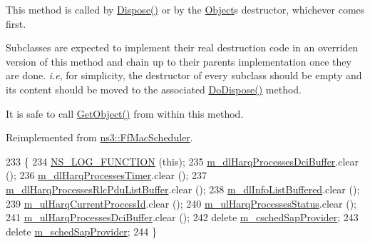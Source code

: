 This method is called by \hyperlink{classns3_1_1Object_aa90ae598863f6c251cdab3c3722afdaf}{Dispose()} or by the \hyperlink{classns3_1_1Object}{Object}\textquotesingle{}s destructor, whichever comes first.

Subclasses are expected to implement their real destruction code in an overriden version of this method and chain up to their parent\textquotesingle{}s implementation once they are done. {\itshape i.\+e}, for simplicity, the destructor of every subclass should be empty and its content should be moved to the associated \hyperlink{classns3_1_1TdMtFfMacScheduler_a8bc40bbb105e766f87f1272bc52bcc86}{Do\+Dispose()} method.

It is safe to call \hyperlink{classns3_1_1Object_a13e18c00017096c8381eb651d5bd0783}{Get\+Object()} from within this method. 

Reimplemented from \hyperlink{classns3_1_1FfMacScheduler_a771411e455992b81d8399681779debd9}{ns3\+::\+Ff\+Mac\+Scheduler}.


\begin{DoxyCode}
233 \{
234   \hyperlink{log-macros-disabled_8h_a90b90d5bad1f39cb1b64923ea94c0761}{NS\_LOG\_FUNCTION} (\textcolor{keyword}{this});
235   \hyperlink{classns3_1_1TdMtFfMacScheduler_ac1da1d9622aa19e81514421bd668bd63}{m\_dlHarqProcessesDciBuffer}.clear ();
236   \hyperlink{classns3_1_1TdMtFfMacScheduler_aa83d8f55bde8ea32e73820ad50ba2821}{m\_dlHarqProcessesTimer}.clear ();
237   \hyperlink{classns3_1_1TdMtFfMacScheduler_a5c8ba74976d19c98462ea970613b644b}{m\_dlHarqProcessesRlcPduListBuffer}.clear ();
238   \hyperlink{classns3_1_1TdMtFfMacScheduler_a4237ad4223d377a1c9963a904acbe4ad}{m\_dlInfoListBuffered}.clear ();
239   \hyperlink{classns3_1_1TdMtFfMacScheduler_a01393611d03f7107ec6c0a0db95858c2}{m\_ulHarqCurrentProcessId}.clear ();
240   \hyperlink{classns3_1_1TdMtFfMacScheduler_a0a4599be9db713d937b6d524a8546f19}{m\_ulHarqProcessesStatus}.clear ();
241   \hyperlink{classns3_1_1TdMtFfMacScheduler_a25c9425db7dae9dad47cd58ae3b70faf}{m\_ulHarqProcessesDciBuffer}.clear ();
242   \textcolor{keyword}{delete} \hyperlink{classns3_1_1TdMtFfMacScheduler_a7aab8900963025a263708c37c0ed490d}{m\_cschedSapProvider};
243   \textcolor{keyword}{delete} \hyperlink{classns3_1_1TdMtFfMacScheduler_aa2136e9f3250b7eab749bc7b58401bd8}{m\_schedSapProvider};
244 \}
\end{DoxyCode}
